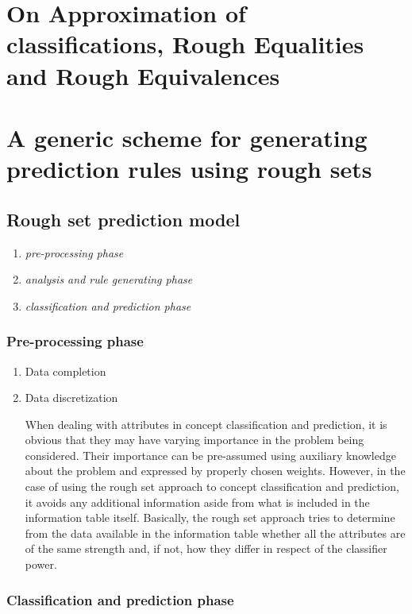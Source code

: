 \documentclass[11pt]{article}
\begin{document}
\section{On Approximation of classifications, Rough Equalities and Rough Equivalences}
\label{sec:org6e2b2ef}
\section{A generic scheme for generating prediction rules using rough sets}
\label{sec:org25b2212}
\subsection{Rough set prediction model}
\label{sec:org0d59467}
\begin{enumerate}
\item \emph{pre-processing phase}
\item \emph{analysis and rule generating phase}
\item \emph{classification and prediction phase}
\end{enumerate}
\subsubsection{Pre-processing phase}
\label{sec:org8720920}
\begin{enumerate}
\item Data completion
\label{sec:org0ebf62d}
\item Data discretization
\label{sec:org028a38e}

When dealing with attributes in concept classification and prediction, it
is obvious that they may have varying importance in the problem being
considered. Their importance can be pre-assumed using auxiliary knowledge
about the problem and expressed by properly chosen weights. However, in the
case of using the rough set approach to concept classification and
prediction, it avoids any additional information aside from what is
included in the information table itself. Basically, the rough set approach
tries to determine from the data available in the information table whether
all the attributes are of the same strength and, if not, how they differ in
respect of the classifier power.
\end{enumerate}
\subsubsection{Classification and prediction phase}
\label{sec:orgaaf6de4}
\end{document}
